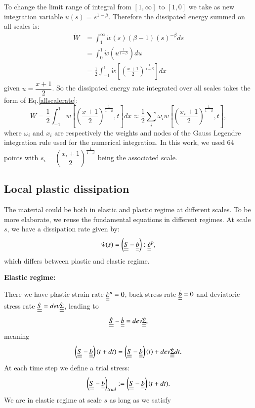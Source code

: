 \documentclass[3p,times,number,review]{elsarticle}
\begin{document}
\noindent
To change the limit range of integral from $[1,\infty]$ to $[1,0]$ we take as new integration variable
$u(s)= s^{1-\beta}$. Therefore the dissipated energy summed on all scales is:
\begin{equation}
\begin{split}
\dot{W}&=\int_{1}^{\infty}\dot{w}(s) (\beta-1)(s)^{-\beta}ds
\\&=\int_{0}^{1}\dot{w}\left( u^{\frac{1}{1-\beta}}\right)du
\\&=\frac{1}{2}\int_{-1}^{1}\dot{w}\left[  \left( \frac{x+1}{2}\right) ^{\frac{1}{1-\beta}}\right] dx
\end{split}
\label{allscale}
\end{equation}
given $u=\dfrac{x+1}{2}$. So the dissipated energy rate integrated over all scales takes the form of Eq.\eqref{allscalerate}:
\begin{equation}
\dot{W}=\frac{1}{2}\int_{-1}^{1}\dot{w}\left[  \left( \frac{x+1}{2}\right) ^{\frac{1}{1-\beta}},t\right] dx\approx\frac{1}{2}\sum_{i}\omega_i\dot{w}\left[  \left( \frac{x_i+1}{2}\right) ^{\frac{1}{1-\beta}},t\right],
\label{allscalerate}
\end{equation}
where $\omega_i$ and $x_i$ are respectively the weights and nodes of the Gauss Legendre integration rule used for the numerical integration.  In this work, we used 64 points\cite{legendre} with $s_i=\left( \dfrac{x_i+1}{2}\right) ^{\frac{1}{1-\beta}}$ being the associated scale.

\subsection{Local plastic dissipation}
The material could be both in elastic and plastic regime at different scales. To be more elaborate, we reuse the fundamental equations in different regimes. At scale $s$, we have a dissipation rate given by:
$$\dot{w}(s)=\left( \uline{\uline{S}}-\uline{\uline{b}}\right):\dot{\uline{\uline{\varepsilon}}}^p, $$
which differs between plastic and elastic regime.

\vspace{6pt}
\noindent
\textbf{Elastic regime:}

\vspace{6pt}
\noindent
There we have
plastic strain rate
$\dot{\uline{\uline{\varepsilon}}}^p=0$, back stress rate $\dot{\uline{\uline{b}}}=0$ and deviatoric stress rate $\dot{\uline{\uline{S}}}=dev\dot{\uline{\uline{\Sigma}}}$, leading to
$$\dot{\uline{\uline{S}}}-\dot{\uline{\uline{b}}}=dev\dot{\uline{\uline{\Sigma}}},$$ 
meaning
$$\left( \uline{\uline{S}}-\uline{\uline{b}}\right) (t+dt)=\left( \uline{\uline{S}}-\uline{\uline{b}}\right) (t)+dev\dot{\uline{\uline{\Sigma}}}dt.$$
At each time step we define a trial stress:
\begin{equation}
\left( \uline{\uline{S}}-\uline{\uline{b}}\right)_{trial}:=\left( \uline{\uline{S}}-\uline{\uline{b}}\right)(t+dt).
\label{trial}
\end{equation}
We are in elastic regime at scale $s$ as long as we satisfy
\end{document}
